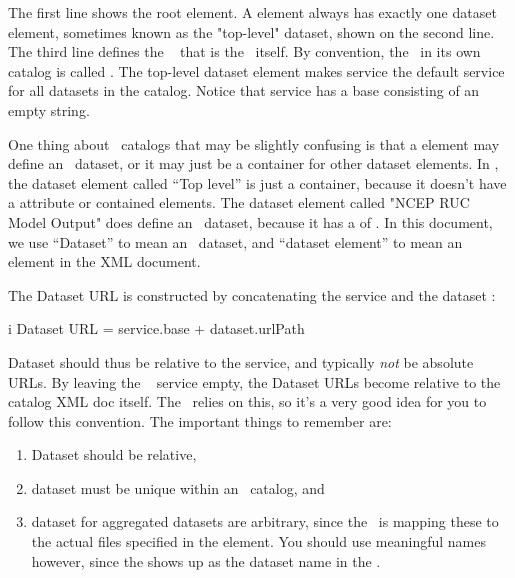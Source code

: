 \documentclass{dods-book}
\begin{document}
The first line shows the root  element. A
 element always has exactly one dataset element,
sometimes known as the "top-level" dataset, shown on the second line.
The third line defines the \opendap\  that is the
\aggser\ itself.  By convention, the \aggser\ in its own catalog is
called . The top-level dataset element makes 
service the default service for all datasets in the catalog. Notice
that  service has a base consisting of an empty string.

One thing about \aggser\ catalogs that may be slightly confusing is
that a  element may define an \opendap\ dataset, or
it may just be a container for other dataset elements. In
, the dataset element called ``Top level'' is just a
container, because it doesn't have a  attribute or
contained  elements. The dataset element called "NCEP RUC
Model Output" does define an \opendap\ dataset, because it has a
 of . In this document, we use ``Dataset'' to
mean an \opendap\ dataset, and ``dataset element'' to mean an element in
the XML document.

The Dataset URL is constructed by concatenating the service  and 
the dataset :

\begin{vcode}{i}
Dataset URL = service.base + dataset.urlPath
\end{vcode}

Dataset  should thus be relative to the service, and
typically  \emph{not} be absolute URLs. By leaving the \aggser\
 service  empty, the Dataset URLs become relative to
the catalog XML doc itself. The \aggser\ relies on this, so it's a
very good idea for you to follow this convention.  The important
things to remember are: 

\begin{enumerate}
\item Dataset  should be relative, 
\item dataset  must be unique within an \aggser\
  catalog, and
\item dataset \tag{urlPaths} for aggregated datasets are arbitrary,
  since the \aggser\ is mapping these to the actual files specified in
  the \tag{aggregation} element. You should use meaningful names
  however, since the \tag{urlPath} shows up as the dataset name in the
  \dds .
\end{enumerate}
\end{document}
